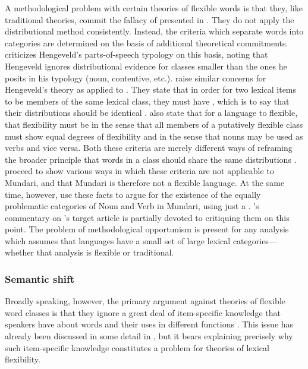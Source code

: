 A methodological problem with certain theories of flexible words is that they, like traditional theories, commit the fallacy of  \parencite[30, 41]{Croft2001b} presented in . They do not apply the distributional method consistently. Instead, the criteria which separate words into categories are determined on the basis of additional theoretical commitments. \textcite[§2.2.2]{Croft2001b} criticizes Hengeveld's parts-of-speech typology on this basis, noting that Hengeveld ignores distributional evidence for classes smaller than the ones he posits in his typology (noun, contentive, etc.). \textcite{EvansOsada2005} raise similar concerns for Hengeveld's theory as applied to . They state that in order for two lexical items to be members of the same lexical class, they must have , which is to say that their distributions should be identical \parencite[366]{EvansOsada2005}. \citeauthor{EvansOsada2005} also state that for a language to flexible, that flexibility must be  in the sense that all members of a putatively flexible class must show equal degrees of flexibility and  in the sense that nouns may be used as verbs and vice versa. Both these criteria are merely different ways of reframing the broader principle that words in a class should share the same distributions \parencite[434]{Croft2005}. \citeauthor{EvansOsada2005} proceed to show various ways in which these criteria are not applicable to Mundari, and that Mundari is therefore not a flexible language. At the same time, however, \citeauthor{EvansOsada2005} use these facts to argue for the existence of the equally problematic categories of Noun and Verb in Mundari, using just a . \citeauthor{Croft2005}'s \parencite*{Croft2005} commentary on \citeauthor{EvansOsada2005}'s target article is partially devoted to critiquing them on this point. The problem of methodological opportunism is present for any analysis which assumes that languages have a small set of large lexical categories—whether that analysis is flexible or traditional.

\subsubsection{Semantic shift}
\label{sec:2.3.3.2}

Broadly speaking, however, the primary argument against theories of flexible word classes is that they ignore a great deal of item-specific knowledge that speakers have about words and their uses in different functions \parencites[§3.2]{EvansOsada2005}[216]{Beck2013}. This issue has already been discussed in some detail in , but it bears explaining precisely why such item-specific knowledge constitutes a problem for theories of lexical flexibility.


